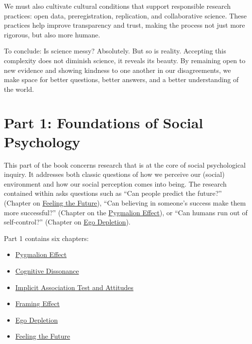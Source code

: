 \documentclass[
  letterpaper,
]{book}
\providecommand{\tightlist}{%
  \setlength{\itemsep}{0pt}\setlength{\parskip}{0pt}}\usepackage{longtable,booktabs,array}
\begin{document}
We must also cultivate cultural conditions that support responsible
research practices: open data, preregistration, replication, and
collaborative science. These practices help improve transparency and
trust, making the process not just more rigorous, but also more humane.

To conclude: Is science messy? Absolutely. But so is reality. Accepting
this complexity does not diminish science, it reveals its beauty. By
remaining open to new evidence and showing kindness to one another in
our disagreements, we make space for better questions, better answers,
and a better understanding of the world.


\chapter*{\texorpdfstring{{Part 1: Foundations of Social
Psychology}}{Part 1: Foundations of Social Psychology}}\label{part-1-foundations-of-social-psychology}


This part of the book concerns research that is at the core of social
psychological inquiry. It addresses both classic questions of how we
perceive our (social) environment and how our social perception comes
into being. The research contained within asks questions such as ``Can
people predict the future?'' (Chapter on \href{chapter6.qmd}{Feeling the
Future}), ``Can believing in someone's success make them more
successful?'' (Chapter on the \href{chapter2.qmd}{Pygmalion Effect}), or
``Can humans run out of self-control?'' (Chapter on
\href{chapter5.qmd}{Ego Depletion}).

Part 1 contains six chapters:

\begin{itemize}
\tightlist
\item
  \href{chapter2.qmd}{Pygmalion Effect}
\item
  \href{chapter3.qmd}{Cognitive Dissonance}
\item
  \href{chapter15.qmd}{Implicit Association Test and Attitudes}
\item
  \href{chapter25.qmd}{Framing Effect}
\item
  \href{chapter5.qmd}{Ego Depletion}
\item
  \href{chapter6.qmd}{Feeling the Future}
\end{itemize}
\end{document}
